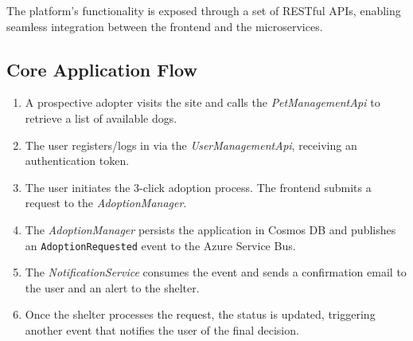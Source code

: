 The platform's functionality is exposed through a set of RESTful APIs, enabling seamless integration between the frontend and the microservices.

\subsection*{Core Application Flow}
\begin{enumerate}
    \item A prospective adopter visits the site and calls the \textit{PetManagementApi} to retrieve a list of available dogs.
    \item The user registers/logs in via the \textit{UserManagementApi}, receiving an authentication token.
    \item The user initiates the 3-click adoption process. The frontend submits a request to the \textit{AdoptionManager}.
    \item The \textit{AdoptionManager} persists the application in Cosmos DB and publishes an \texttt{AdoptionRequested} event to the Azure Service Bus.
    \item The \textit{NotificationService} consumes the event and sends a confirmation email to the user and an alert to the shelter.
    \item Once the shelter processes the request, the status is updated, triggering another event that notifies the user of the final decision.
\end{enumerate}

